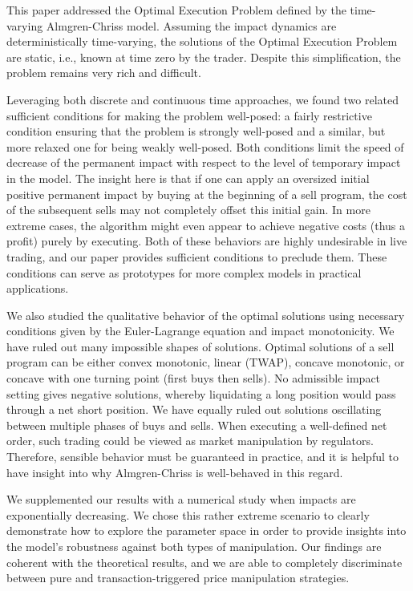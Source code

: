 \documentclass[final,3p,authoryear,12pt]{elsarticle}
\begin{document}
This paper addressed the Optimal Execution Problem defined by the time-varying Almgren-Chriss model. Assuming the impact dynamics are deterministically time-varying, the solutions of the Optimal Execution Problem are static, i.e., known at time zero by the trader. Despite this simplification, the problem remains very rich and difficult.

Leveraging both discrete and continuous time approaches, we found two related sufficient conditions for making the problem well-posed: a fairly restrictive condition ensuring that the problem is strongly well-posed and a similar, but more relaxed one for being weakly well-posed. Both conditions limit the speed of decrease of the permanent impact with respect to the level of temporary impact in the model. The insight here is that if one can apply an oversized initial positive permanent impact by buying at the beginning of a sell program, the cost of the subsequent sells may not completely offset this initial gain. In more extreme cases, the algorithm might even appear to achieve negative costs (thus a profit) purely by executing. Both of these behaviors are highly undesirable in live trading, and our paper provides sufficient conditions to preclude them. These conditions can serve as prototypes for more complex models in practical applications.

We also studied the qualitative behavior of the optimal solutions using necessary conditions given by the Euler-Lagrange equation and impact monotonicity. We have ruled out many impossible shapes of solutions. Optimal solutions of a sell program can be either convex monotonic, linear (TWAP), concave monotonic, or concave with one turning point (first buys then sells). No admissible impact setting gives negative solutions, whereby liquidating a long position would pass through a net short position. We have equally ruled out solutions oscillating between multiple phases of buys and sells. When executing a well-defined net order, such trading could be viewed as market manipulation by regulators. Therefore, sensible behavior must be guaranteed in practice, and it is helpful to have insight into why Almgren-Chriss is well-behaved in this regard.

%

We supplemented our results with a numerical study when impacts are exponentially decreasing. We chose this rather extreme scenario to clearly demonstrate how to explore the parameter space in order to provide insights into the model's robustness against both types of manipulation. Our findings are coherent with the theoretical results, and we are able to completely discriminate between pure and transaction-triggered price manipulation strategies. 
\end{document}
